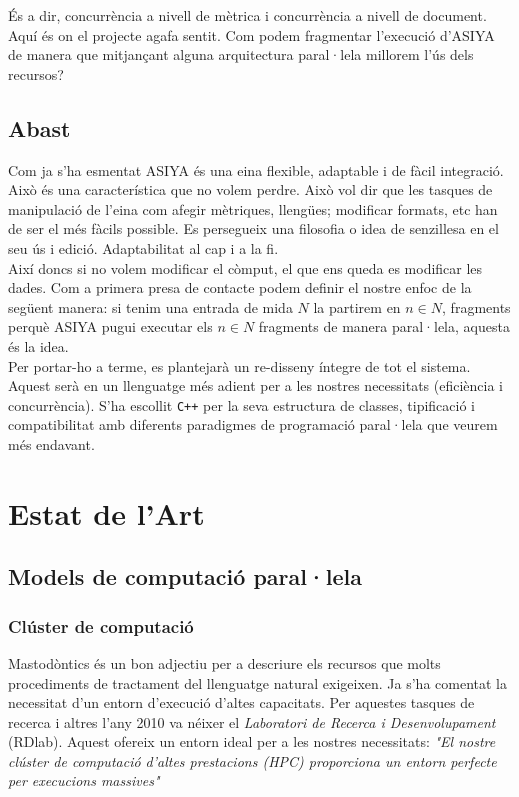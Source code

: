 \documentclass[11pt,a4paper]{article}
\begin{document}
És a dir, concurrència a nivell de mètrica i concurrència a nivell de document.
\\

Aquí és on el projecte agafa sentit. Com podem fragmentar l'execució d'ASIYA de manera que mitjançant alguna arquitectura paral·lela millorem l'ús dels recursos?
\\

\subsection{Abast}
Com ja s'ha esmentat ASIYA és una eina flexible, adaptable i de fàcil integració. Això és una característica que no volem perdre.  Això vol dir que les tasques de manipulació de l'eina com afegir mètriques, llengües; modificar formats, etc han de ser el més fàcils possible. Es persegueix una filosofia o idea de senzillesa en el seu ús i edició. Adaptabilitat al cap i a la fi.
\\

Així doncs si no volem modificar el còmput, el que ens queda es modificar les dades. Com a primera presa de contacte podem definir el nostre enfoc de la següent manera: si tenim una entrada de mida $N$ la partirem en $n \in N$, fragments perquè ASIYA pugui executar els $n \in N$ fragments de manera paral·lela, aquesta és la idea.
\\

Per portar-ho a terme, es plantejarà un re-disseny íntegre de tot el sistema. Aquest serà en un llenguatge més adient per a les nostres necessitats (eficiència i concurrència). S'ha escollit \texttt{C++} per la seva estructura de classes, tipificació i compatibilitat amb diferents paradigmes de programació paral·lela que veurem més endavant.

\newpage
\section{Estat de l'Art}

\subsection{Models de computació paral·lela}

\subsubsection{Clúster de computació}
Mastodòntics és un bon adjectiu per a descriure els recursos que molts procediments de tractament del llenguatge natural exigeixen. Ja s'ha comentat la necessitat d'un entorn d'execució d'altes capacitats. Per aquestes tasques de recerca i altres l'any 2010 va néixer el \textit{Laboratori de Recerca i Desenvolupament} (RDlab). Aquest ofereix un entorn ideal per a les nostres necessitats: \textit{"El nostre clúster de computació d'altes prestacions (HPC) proporciona un entorn perfecte per execucions massives"}\cite{cluster}
\\
\end{document}
